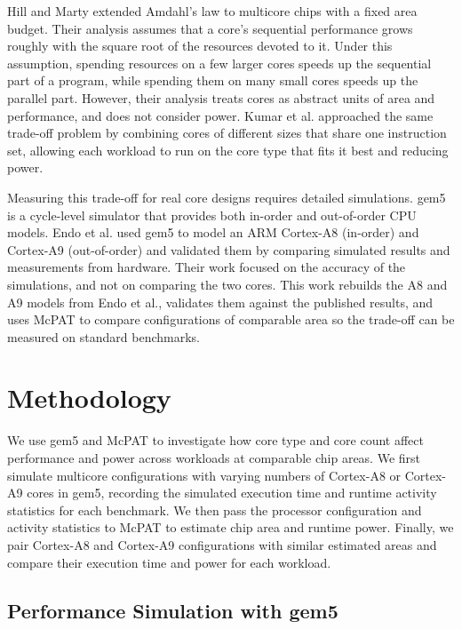 \documentclass[conference,9pt]{IEEEtran}
\begin{document}
Hill and Marty \cite{4563876} extended Amdahl's law to multicore chips with a fixed area budget. Their analysis assumes that a core's sequential performance grows roughly with the square root of the resources devoted to it. Under this assumption, spending resources on a few larger cores speeds up the sequential part of a program, while spending them on many small cores speeds up the parallel part. However, their analysis treats cores as abstract units of area and performance, and does not consider power. Kumar et al. \cite{1253185} approached the same trade-off problem by combining cores of different sizes that share one instruction set, allowing each workload to run on the core type that fits it best and reducing power.

Measuring this trade-off for real core designs requires detailed simulations. gem5 \cite{10.1145/2024716.2024718} is a cycle-level simulator that provides both in-order and out-of-order CPU models. Endo et al. \cite{6893220} used gem5 to model an ARM Cortex-A8 (in-order) and Cortex-A9 (out-of-order) and validated them by comparing simulated results and measurements from hardware. Their work focused on the accuracy of the simulations, and not on comparing the two cores. This work rebuilds the A8 and A9 models from Endo et al., validates them against the published results, and uses McPAT to compare configurations of comparable area so the trade-off can be measured on standard benchmarks.

\section{Methodology}

We use gem5 and McPAT to investigate how core type and core count affect performance and power across workloads at comparable chip areas. We first simulate multicore configurations with varying numbers of Cortex-A8 or Cortex-A9 cores in gem5, recording the simulated execution time and runtime activity statistics for each benchmark. We then pass the processor configuration and activity statistics to McPAT to estimate chip area and runtime power. Finally, we pair Cortex-A8 and Cortex-A9 configurations with similar estimated areas and compare their execution time and power for each workload.

\subsection{Performance Simulation with gem5}
\end{document}
